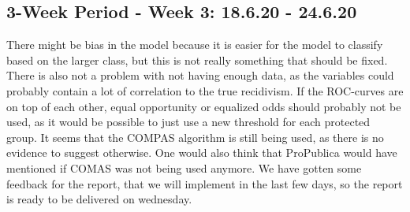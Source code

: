\documentclass[11pt, fleqn]{article}
\begin{document}
\subsection*{3-Week Period - Week 3: 18.6.20 - 24.6.20}
There might be bias in the model because it is easier for the model to classify based on the larger class, but this is not really something that should be fixed. There is also not a problem with not having enough data, as the variables could probably contain a lot of correlation to the true recidivism. If the ROC-curves are on top of each other, equal opportunity or equalized odds should probably not be used, as it would be possible to just use a new threshold for each protected group.
It seems that the COMPAS algorithm is still being used, as there is no evidence to suggest otherwise. One would also think that ProPublica would have mentioned if COMAS was not being used anymore. We have gotten some feedback for the report, that we will implement in the last few days, so the report is ready to be delivered on wednesday.
	
\end{document}
